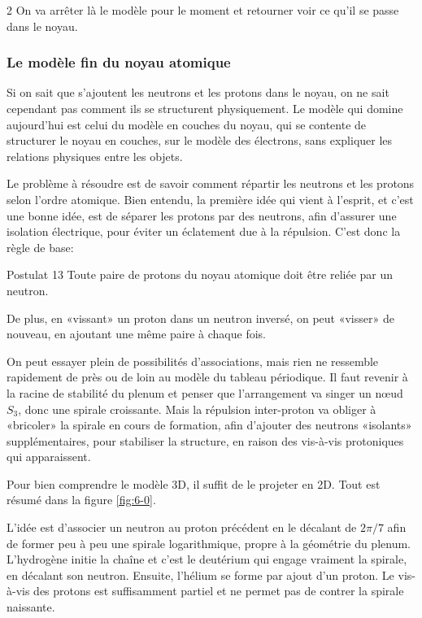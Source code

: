 \begin{multicols}{2}
On va arrêter là le modèle pour le moment et retourner voir ce qu'il
se passe dans le noyau.

\subsubsection{Le modèle fin du noyau atomique}

Si on sait que s'ajoutent les neutrons et les protons dans le noyau, on
ne sait cependant pas comment ils se structurent physiquement. Le modèle qui domine
aujourd'hui est celui du modèle en couches du noyau, qui se contente de
structurer le noyau en couches, sur le modèle des électrons, sans
expliquer les relations physiques entre les objets.

Le problème à résoudre est de savoir comment répartir les neutrons et les
protons selon l'ordre atomique. Bien entendu, la première idée qui vient à l'esprit, et
c'est une bonne idée, est de séparer les protons par des neutrons,
afin d'assurer une isolation électrique, pour éviter un éclatement due
à la répulsion. C'est donc la règle de base:

\begin{mybox}[breakable,colback=blue!10, colbacktitle=pkcolor]{Postulat 13}
	Toute paire de protons du noyau atomique doit être reliée par un neutron.
\end{mybox}
\medskip

De plus, en «vissant» un proton dans un neutron inversé, on peut
«visser» de nouveau, en ajoutant une même paire à chaque fois.

On peut essayer plein de possibilités d'associations, mais rien ne ressemble
rapidement de près ou de loin au modèle du tableau périodique. Il faut
revenir à la racine de stabilité du plenum et penser que l'arrangement
va singer un nœud $S_3$, donc une spirale croissante. Mais la répulsion
inter-proton va obliger à «bricoler» la spirale en cours de
formation, afin d'ajouter des neutrons «isolants» supplémentaires,
pour stabiliser la structure, en raison des vis-à-vis protoniques
qui apparaissent.

Pour bien comprendre le modèle 3D, il suffit de le projeter en 2D.
Tout est résumé dans la figure \ref{fig:6-0}.

L'idée est d'associer un neutron au proton précédent en le
décalant de $2\pi/7$ afin de former peu à peu une spirale logarithmique,
propre à la géométrie du plenum. L'hydrogène initie la chaîne et c'est
le deutérium qui engage vraiment la spirale, en décalant son neutron.
Ensuite, l'hélium se forme par ajout d'un proton. Le vis-à-vis des
protons est suffisamment partiel et ne permet pas de contrer la
spirale naissante.


\end{multicols}
